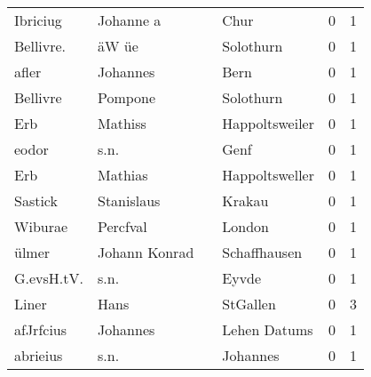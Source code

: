 \begin{center}
\begin{tiny}
\begin{longtabu}{llllrr}
                 Ibriciug &                          Johanne a &             &                                        Chur &          0 &         1 \\
                Bellivre. &                              äW üe &             &                                   Solothurn &          0 &         1 \\
                    afler &                           Johannes &             &                                        Bern &          0 &         1 \\
                 Bellivre &                            Pompone &             &                                   Solothurn &          0 &         1 \\
                      Erb &                            Mathiss &             &                              Happoltsweiler &          0 &         1 \\
                    eodor &                               s.n. &             &                                        Genf &          0 &         1 \\
                      Erb &                            Mathias &             &                              Happoltsweller &          0 &         1 \\
                  Sastick &                         Stanislaus &             &                                      Krakau &          0 &         1 \\
                  Wiburae &                           Percfval &             &                                      London &          0 &         1 \\
                    ülmer &                      Johann Konrad &             &                                Schaffhausen &          0 &         1 \\
               G.evsH.tV. &                               s.n. &             &                                       Eyvde &          0 &         1 \\
                    Liner &                               Hans &             &                                    StGallen &          0 &         3 \\
                afJrfcius &                           Johannes &             &                                Lehen Datums &          0 &         1 \\
                 abrieius &                               s.n. &             &                                    Johannes &          0 &         1 \\

\end{longtabu}
\end{tiny}
\end{center}

